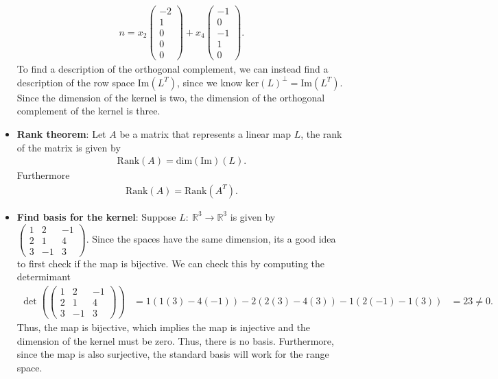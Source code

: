 \documentclass{report}
\begin{document}
\begin{itemize}
            \begin{align*}
                n = x_{2}\begin{pmatrix} -2 \\ 1 \\ 0 \\ 0 \\ 0\end{pmatrix} + x_{4}\begin{pmatrix} -1 \\ 0 \\ -1 \\ 1 \\ 0 \end{pmatrix}
            .\end{align*}
            \bigbreak \noindent 
            To find a description of the orthogonal complement, we can instead find a description of the row space $\text{Im}(L^{T})$, since we know $\text{ker}(L)^{\perp}  = \text{Im}(L^{T})$. Since the dimension of the kernel is two, the dimension of the orthogonal complement of the kernel is three.
        \item \textbf{Rank theorem}: Let $A$ be a matrix that represents a linear map $L$, the rank of the matrix is given by
            \begin{align*}
                \text{Rank}(A) = \text{dim}(\text{Im})(L)
            .\end{align*}
            Furthermore
            \begin{align*}
                \text{Rank}(A) = \text{Rank}(A^{T})
            .\end{align*}
        \item \textbf{Find basis for the kernel}: Suppose $L:\ \mathbb{R}^{3} \to \mathbb{R}^{3}$ is given by $\begin{pmatrix} 1 & 2 & -1 \\ 2 & 1 & 4 \\ 3 & -1 & 3 \end{pmatrix} $. Since the spaces have the same dimension, its a good idea to first check if the map is bijective. We can check this by computing the determimant
            \bigbreak \noindent 
            \begin{align*}
                \det{\left(\begin{pmatrix} 1 & 2 & -1 \\ 2 & 1 & 4 \\ 3 & -1 & 3 \end{pmatrix}\right)}  &= 1 (1(3) - 4(-1)) - 2(2(3) - 4(3)) -1 (2(-1) - 1(3))
                                             &=23 \ne 0
            .\end{align*}
            Thus, the map is bijective, which implies the map is injective and the dimension of the kernel must be zero. Thus, there is no basis. Furthermore, since the map is also surjective, the standard basis will work for the range space.





        
            


    \end{itemize}
\end{document}
